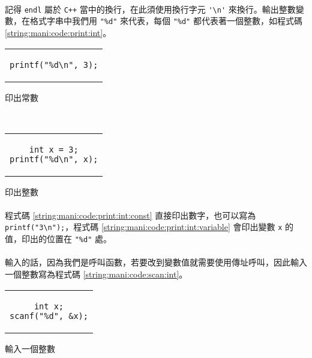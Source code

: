 \documentclass[12pt,a4paper,oneside]{report}
\begin{document}
\begin{CJK}{UTF8}{bkai}
\paragraph{}記得 \lstinline!endl! 屬於 \texttt{C++} 當中的換行，在此須使用換行字元 \lstinline!'\n'! 來換行。輸出整數變數，在格式字串中我們用 \lstinline!"%d"! 來代表，每個 \lstinline!"%d"! 都代表著一個整數，如程式碼 \ref{string:mani:code:print:int}。

\begin{code}[h!]
  \centering
  \begin{subcode}{.33\textwidth}
    \centering
    \begin{tabular}{c}
    \begin{lstlisting}
printf("%d\n", 3);
    \end{lstlisting}
    \end{tabular}
    \caption{印出常數}
    \label{string:mani:code:print:int:const}
  \end{subcode}
  ~
  \begin{subcode}{.33\textwidth}
    \centering
    \begin{tabular}{c}
    \begin{lstlisting}
int x = 3;
printf("%d\n", x);
    \end{lstlisting}
    \end{tabular}
    \caption{印出 \lstinline!int! 變數}
    \label{string:mani:code:print:int:variable}
  \end{subcode}
  \caption{印出整數}
  \label{string:mani:code:print:int}
\end{code}

\paragraph{}程式碼 \ref{string:mani:code:print:int:const} 直接印出數字，也可以寫為 \lstinline!printf("3\n");!，程式碼 \ref{string:mani:code:print:int:variable} 會印出變數 \lstinline!x! 的值，印出的位置在 \lstinline!"%d"! 處。
\paragraph{}輸入的話，因為我們是呼叫函數，若要改到變數值就需要使用傳址呼叫，因此輸入一個整數寫為程式碼 \ref{string:mani:code:scan:int}。

\begin{code}[h!]
  \centering
  \begin{tabular}{c}
  \begin{lstlisting}
int x;
scanf("%d", &x);
  \end{lstlisting}
  \end{tabular}
  \caption{輸入一個整數}
  \label{string:mani:code:scan:int}
\end{code}


\end{CJK}
\end{document}
